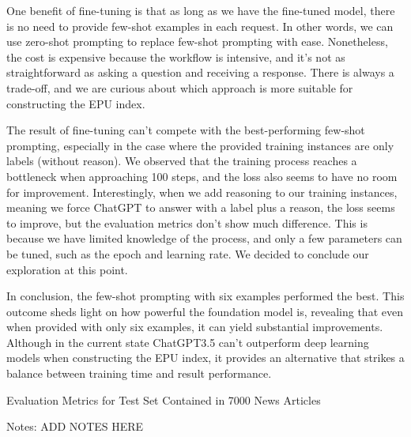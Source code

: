 \documentclass[11pt,english]{report}
\begin{document}
One benefit of fine-tuning is that as long as we have the fine-tuned model,
there is no need to provide few-shot examples in each request. In other words,
we can use zero-shot prompting to replace few-shot prompting with ease.
Nonetheless, the cost is expensive because the workflow is intensive, and it's
not as straightforward as asking a question and receiving a response. There is
always a trade-off, and we are curious about which approach is more suitable
for constructing the EPU index.

The result of fine-tuning can't compete with the best-performing few-shot
prompting, especially in the case where the provided training instances are
only labels (without reason). We observed that the training process reaches a
bottleneck when approaching 100 steps, and the loss also seems to have no room
for improvement. Interestingly, when we add reasoning to our training
instances, meaning we force ChatGPT to answer with a label plus a reason, the
loss seems to improve, but the evaluation metrics don't show much difference.
This is because we have limited knowledge of the process, and only a few
parameters can be tuned, such as the epoch and learning rate. We decided to
conclude our exploration at this point.

In conclusion, the few-shot prompting with six examples performed the best.
This outcome sheds light on how powerful the foundation model is, revealing
that even when provided with only six examples, it can yield substantial
improvements. Although in the current state ChatGPT3.5 can't outperform deep
learning models when constructing the EPU index, it provides an alternative
that strikes a balance between training time and result performance.

\vspace{0.3cm}
\begin{table}[H]
\renewcommand\arraystretch{1.5}
\caption{Evaluation Metrics for Test Set Contained in 7000 News Articles} 
\label{tab: PayDexMin DID}
\begin{adjustwidth}{-0.0cm}{}
\begin{center}
\setlength{\tabcolsep}{8pt}
{\fontsize{10}{12} \selectfont 
     
}
\end{center}
\end{adjustwidth}
\footnotesize{
\begin{justify}
Notes: ADD NOTES HERE
\end{justify}
}
\end{table}
\end{document}
